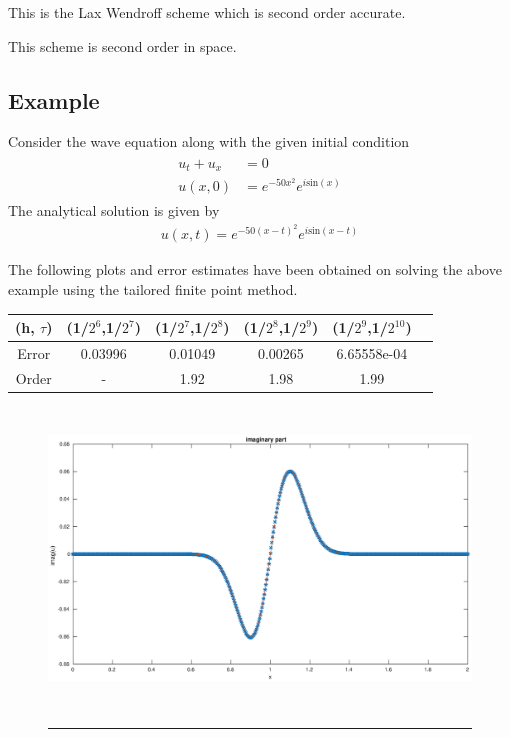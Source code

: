 This is the Lax Wendroff scheme which is second order accurate.

This scheme is second order in space.


\subsection{Example}
Consider the wave equation along with the given initial condition
\begin{align}
 \begin{split}
  u_{t} + u_{x} &= 0\\
   u(x,0) &= e^{-50x^2}e^{i\text{sin}(x)}
 \end{split} 
\end{align}
The analytical solution is given by
\begin{align}
 u(x,t) = e^{-50(x-t)^2}e^{i\text{sin}(x-t)}
\end{align}

The following plots and error estimates have been obtained on solving the above example using the tailored finite point method.\\

\vspace{2cm}

\begin{tabular}{|c|c|c|c|c|c|}
   \hline
   (h, $\tau$)  & (1/$2^{6}$,1/$2^{7}$)  & (1/$2^{7}$,1/$2^{8}$) & (1/$2^{8}$,1/$2^{9}$) &  (1/$2^{9}$,1/$2^{10}$)\\
  \hline
  Error  & 0.03996  & 0.01049 & 0.00265 &  6.65558e-04\\
  \hline
  Order & -  &  1.92  & 1.98 & 1.99\\
\hline
\end{tabular}

\begin{figure}[htbp]
	\centering
		\includegraphics[height=8cm]{Figures/imag_CTFPM.eps}\\
		\rule{35em}{0.5pt}
	\caption[RCTFPM Real part]{}
\end{figure}

